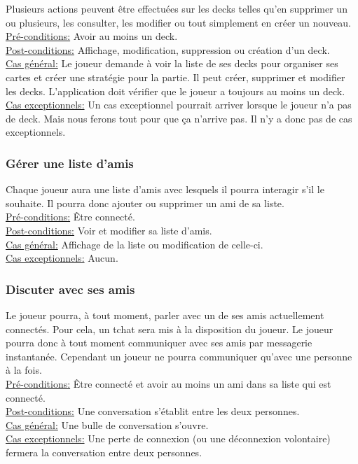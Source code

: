 \documentclass[11pt,a4paper]{article}
\begin{document}
Plusieurs actions peuvent être effectuées sur les decks telles
qu'en supprimer un ou plusieurs, les consulter, les modifier ou tout
simplement en créer un nouveau.\\
\underline{Pré-conditions:} 
 Avoir au moins un deck.\\
\underline{Post-conditions:} 
 Affichage, modification, suppression ou création d'un deck.\\
\underline{Cas général:} 
 Le joueur demande à voir la liste de ses decks pour organiser ses cartes et créer une stratégie pour la partie.  Il peut créer, supprimer et modifier les decks.  L'application doit vérifier que le joueur a toujours au moins un deck.\\
\underline{Cas exceptionnels:} 
 Un cas exceptionnel pourrait arriver lorsque le joueur n'a pas de deck.  Mais nous ferons tout pour que ça n'arrive pas.  Il n'y a donc pas de cas exceptionnels.\\

\subsubsection*{Gérer une liste d'amis}

Chaque joueur aura une liste d'amis avec lesquels il pourra
interagir s'il le souhaite. Il pourra donc ajouter ou supprimer un ami de sa liste.\\
\underline{Pré-conditions:} 
 Être connecté.\\
\underline{Post-conditions:} 
 Voir et modifier sa liste d'amis.\\
\underline{Cas général:} 
 Affichage de la liste ou modification de celle-ci.\\
\underline{Cas exceptionnels:} 
 Aucun.\\

\subsubsection*{Discuter avec ses amis}

Le joueur pourra, à tout moment, parler avec un de ses amis
actuellement connectés. Pour cela, un \gls{tchat} sera mis à la disposition
du joueur.  Le joueur pourra donc à tout moment communiquer avec ses amis par
messagerie instantanée. Cependant un joueur ne pourra communiquer qu'avec
une personne à la fois.\\
\underline{Pré-conditions:} 
 Être connecté et avoir au moins un ami dans sa liste qui est connecté.\\
\underline{Post-conditions:} 
 Une conversation s'établit entre les deux personnes.\\
\underline{Cas général:} 
 Une bulle de conversation s'ouvre.\\
\underline{Cas exceptionnels:} 
 Une perte de connexion (ou une déconnexion volontaire) fermera la conversation entre deux personnes.\\
\end{document}

